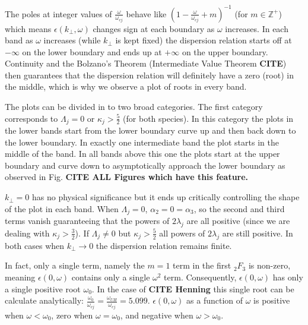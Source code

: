 \documentclass[12pt,a4paper]{article}
\begin{document}
    The poles at integer values of $\frac{\omega}{\omega_{cj}}$ behave like $(1 - \frac{\omega}{\omega_{cj}} + m)^{-1}$ (for $m \in \mathbb{Z}^+$) which means $\epsilon(k_\perp, \omega)$ changes sign at each boundary as $\omega$ increases.
    In each band as $\omega$ increases (while $k_\perp$ is kept fixed) the dispersion relation starts off at $-\infty$ on the lower boundary and ends up at $+\infty$ on the upper boundary.
    Continuity and the Bolzano's Theorem (Intermediate Value Theorem \textbf{CITE}) then guarantees that the dispersion relation will definitely have a zero (root) in the middle, which is why we observe a plot of roots in every band.

    The plots can be divided in to two broad categories.
    The first category corresponds to $\Lambda_j = 0$ or $\kappa_j > \frac{5}{2}$ (for both species).
    In this category the plots in the lower bands start from the lower boundary curve up and then back down to the lower boundary.
    In exactly one intermediate band the plot starts in the middle of the band.
    In all bands above this one the plots start at the upper boundary and curve down to asymptotically approach the lower boundary as observed in Fig. \textbf{CITE ALL Figures which have this feature.}

    $k_\perp = 0$ has no physical significance but it ends up critically controlling the shape of the plot in each band.
    When $\Lambda_j = 0$, $\alpha_2 = 0 = \alpha_3$, so the second and third terms vanish guaranteeing that the powers of $2 \lambda_j$ are all positive (since we are dealing with $\kappa_j > \frac{3}{2}$).
    If $\Lambda_j \neq 0$ but $\kappa_j > \frac{5}{2}$ all powers of $2 \lambda_j$ are still positive.
    In both cases when $k_\perp \rightarrow 0$ the dispersion relation remains finite.

    In fact, only a single term, namely the $m = 1$ term in the first $_2F_3$ is non-zero, meaning $\epsilon(0, \omega)$ contains only a single $\omega^2$ term.
    Consequently, $\epsilon(0, \omega)$ has only a single positive root $\omega_0$.
    In the case of \textbf{CITE Henning} this single root can be calculate analytically: $\frac{\omega_0}{\omega_{cj}} = \frac{\omega_{UH}}{\omega_{cj}} = 5.099$.
    $\epsilon(0, \omega)$ as a function of $\omega$ is positive when $\omega < \omega_0$, zero when $\omega = \omega_0$, and negative when $\omega > \omega_0$.
\end{document}
